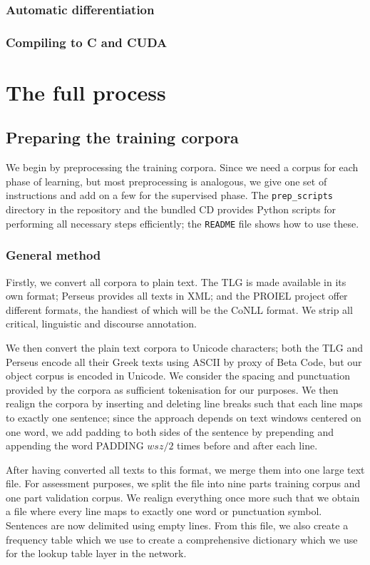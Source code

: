 \subsubsection{Automatic differentiation}
\label{sec:autodiff}
\subsubsection{Compiling to C and CUDA}
\label{sec:graph}

\section{The full process}
\label{sec:process}
\subsection{Preparing the training corpora}
\label{sec:trainingcorpora}
We begin by preprocessing the training corpora. Since we need a corpus
for each phase of learning, but most preprocessing is analogous, we
give one set of instructions and add on a few for the supervised
phase. The \texttt{prep\_scripts} directory in the repository and the
bundled CD provides Python scripts for performing all necessary steps
efficiently; the \texttt{README} file shows how to use these.

\subsubsection{General method}
\label{sec:supcorp}
Firstly, we convert all corpora to plain text. The TLG is made
available in its own format; Perseus provides all texts in XML; and
the PROIEL project offer different formats, the handiest of which will
be the CoNLL format. We strip all critical, linguistic and discourse
annotation.

We then convert the plain text corpora to Unicode characters; both the
TLG and Perseus encode all their Greek texts using ASCII by proxy of
Beta Code, but our object corpus is encoded in Unicode. We consider
the spacing and punctuation provided by the corpora as sufficient
tokenisation for our purposes. We then realign the corpora by
inserting and deleting line breaks such that each line maps to exactly
one sentence; since the approach depends on text windows centered on
one word, we add padding to both sides of the sentence by prepending
and appending the word PADDING $wsz / 2$ times before and after each
line.

After having converted all texts to this format, we merge them into
one large text file. For assessment purposes, we split the file into
nine parts training corpus and one part validation corpus. We realign
everything once more such that we obtain a file where every line maps
to exactly one word or punctuation symbol. Sentences are now delimited
using empty lines. From this file, we also create a frequency table
which we use to create a comprehensive dictionary which we use for the
lookup table layer in the network.

